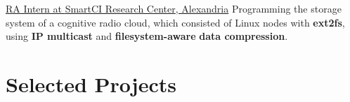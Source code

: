 \documentclass[letterpaper]{twentysecondcv} %
\begin{document}
\begin{twenty}
               {\underline{RA Intern at \textcolor{OliveGreen}{SmartCI Research Center}, Alexandria}}
               {}
               {Programming the storage system of a cognitive radio cloud, which consisted of
                Linux nodes with \textbf{ext2fs}, using \textbf{IP multicast} and \textbf{filesystem-aware}
                \textbf{data compression}.}

\end{twenty}


\section{Selected Projects}
\end{document}
